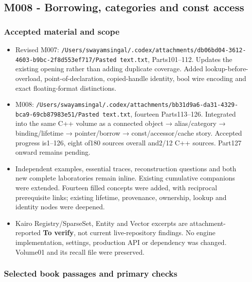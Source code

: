 \subsection{M008 - Borrowing, categories and const access}\label{appendix-a103e7846d21-m008---borrowing-categories-and-const-access}

\hypertarget{appendix-a103e7846d21-m008---borrowing-categories-and-const-access}{}

\subsubsection{Accepted material and scope}\label{appendix-a103e7846d21-accepted-material-and-scope}

\hypertarget{appendix-a103e7846d21-accepted-material-and-scope}{}

\begin{itemize}
\tightlist
\item
  Revised M007: \texttt{/Users/swayamsingal/.codex/attachments/db06bd04-3612-4603-b9bc-2f8d553ef717/Pasted\ text.txt}, Parts101--112. Updates the existing opening rather than adding duplicate coverage. Added lookup-before-overload, point-of-declaration, copied-handle identity, bool wire encoding and exact floating-format distinctions.
\item
  M008: \texttt{/Users/swayamsingal/.codex/attachments/bb31d9a6-da31-4329-bca9-69cb87983e51/Pasted\ text.txt}, fourteen Parts113--126. Integrated into the same C++ volume as a connected object → alias/category → binding/lifetime → pointer/borrow → const/accessor/cache story. Accepted progress is1--126, eight of180 sources overall and2/12 C++ sources. Part127 onward remains pending.
\item
  Independent examples, essential traces, reconstruction questions and both new complete laboratories remain inline. Existing cumulative companions were extended. Fourteen filled concepts were added, with reciprocal prerequisite links; existing lifetime, provenance, ownership, lookup and identity nodes were deepened.
\item
  Kairo Registry/SparseSet, Entity and Vector excerpts are attachment-reported \textbf{To verify}, not current live-repository findings. No engine implementation, settings, production API or dependency was changed. Volume01 and its recall file were preserved.
\end{itemize}

\subsubsection{Selected book passages and primary checks}\label{appendix-a103e7846d21-selected-book-passages-and-primary-checks}

